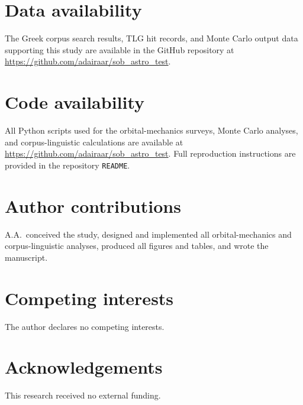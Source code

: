 \documentclass[sn-nature]{sn-jnl}
\begin{document}

\section*{Data availability}
The Greek corpus search results, TLG hit records, and Monte Carlo output data
supporting this study are available in the GitHub repository at
\url{https://github.com/adairaar/sob_astro_test}.

\section*{Code availability}
All Python scripts used for the orbital-mechanics surveys, Monte Carlo
analyses, and corpus-linguistic calculations are available at
\url{https://github.com/adairaar/sob_astro_test}. Full reproduction
instructions are provided in the repository \texttt{README}.

\section*{Author contributions}
A.A.\ conceived the study, designed and implemented all orbital-mechanics and
corpus-linguistic analyses, produced all figures and tables, and wrote the
manuscript.

\section*{Competing interests}
The author declares no competing interests.

\section*{Acknowledgements}
This research received no external funding.




\end{document}
